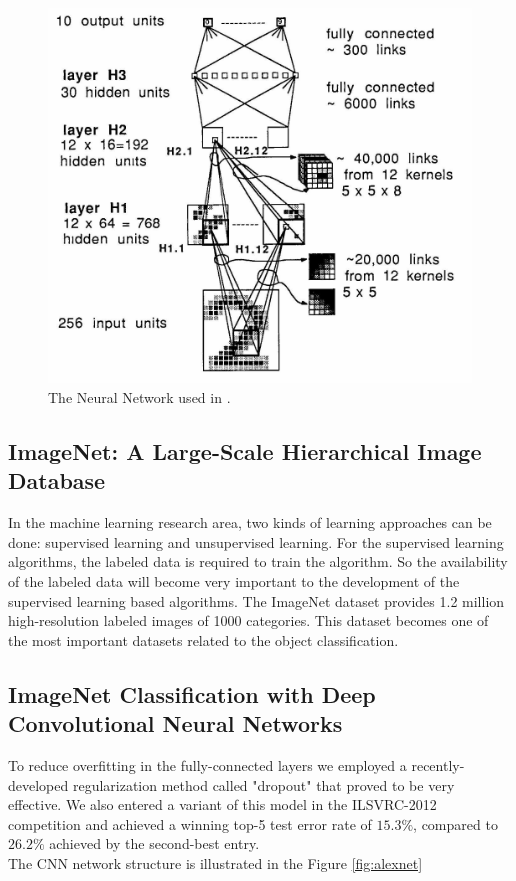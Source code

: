 \documentclass[a4paper,12pt]{article}
\begin{document}
\begin{figure}[H]
  \begin{center}
      \includegraphics[scale=0.8]{bpzip.png}
\end{center}
\caption{The Neural Network used in \cite{doi:10.1162/neco.1989.1.4.541}.}
 \label{fig:bpzip}
 \end{figure}
 
\subsection{ImageNet: A Large-Scale Hierarchical Image Database\cite{imagenet_cvpr09}}
In the machine learning research area, two kinds of learning approaches can be done: supervised learning and unsupervised learning. For the supervised learning algorithms, the labeled data is required to train the algorithm. So the availability of the labeled data will become very important to the development of the supervised learning based algorithms. The ImageNet dataset \cite{imagenet_cvpr09} provides 1.2 million high-resolution labeled images of 1000 categories. This dataset becomes one of the most important datasets related to the object classification.\\

\subsection{ImageNet Classification with Deep Convolutional Neural Networks\cite{NIPS2012_4824}}
To reduce overfitting in the fully-connected layers we employed a recently-developed regularization method called "dropout"\cite{DBLP:journals/corr/abs-1207-0580} that proved to be very effective. We also entered a variant of this model in the ILSVRC-2012 competition and achieved a winning top-5 test error rate of $15.3\%$, compared to $26.2\%$ achieved by the second-best entry.\\
The CNN network structure is illustrated in the Figure \ref{fig:alexnet}
\end{document}
